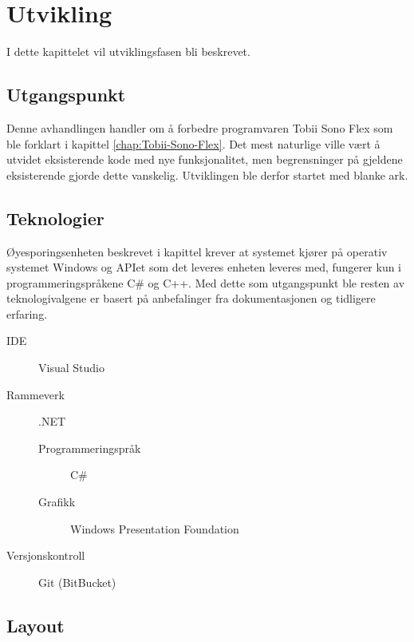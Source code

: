 \documentclass[phd,tocprelim]{cornell}
\begin{document}
\chapter{Utvikling}

I dette kapittelet vil utviklingsfasen bli beskrevet.  


\section{Utgangspunkt}

Denne avhandlingen handler om å forbedre programvaren Tobii Sono Flex som ble forklart i kapittel \ref{chap:Tobii-Sono-Flex}. 
Det mest naturlige ville vært å utvidet eksisterende kode med nye funksjonalitet,  men begrensninger på gjeldene eksisterende gjorde dette vanskelig. Utviklingen ble derfor startet med blanke ark. 


\section{Teknologier}

Øyesporingsenheten beskrevet i kapittel  krever at systemet kjører på operativ systemet Windows og APIet som det leveres enheten leveres med,  fungerer kun i programmeringspråkene C\# og C++. Med dette som utgangspunkt ble resten av teknologivalgene er basert på anbefalinger fra dokumentasjonen og tidligere erfaring. 

\begin{description}
  \item[IDE] Visual Studio
  \item[Rammeverk] .NET
  \begin{description}
     \item[Programmeringspråk] C\#
     \item[Grafikk] Windows Presentation Foundation 
\end{description}
  \item[Versjonskontroll] Git (BitBucket)
\end{description}



\section{Layout}
\end{document}
